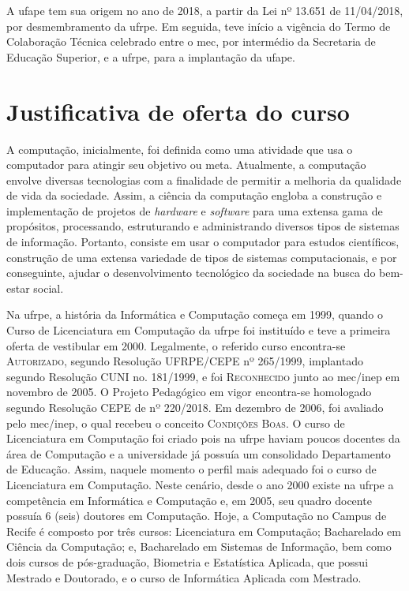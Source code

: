 \documentclass[
	12pt,				%
	openright,			%
  oneside,     %
	a4paper,			%
 hyphens,
	chapter=TITLE,		%
	english,			%
	french,				%
	spanish,			%
	brazil				%
	]{abntex2}
\begin{document}
A \acrshort{ufape} tem sua origem no ano de 2018, a partir da Lei nº 13.651 de 11/04/2018, por desmembramento da \acrshort{ufrpe}. Em seguida, teve início a vigência do Termo de Colaboração Técnica celebrado entre o \acrshort{mec}, por intermédio da Secretaria de Educação Superior, e a \acrshort{ufrpe}, para a implantação da \acrshort{ufape}.

\chapter{Justificativa de oferta do curso}

A computação, inicialmente, foi definida como uma atividade que usa o computador para atingir seu objetivo ou meta. Atualmente, a computação envolve diversas tecnologias com a finalidade de permitir a melhoria da qualidade de vida da sociedade. Assim, a ciência da computação engloba a construção e implementação de projetos de \textit{hardware} e \textit{software} para uma extensa gama de propósitos, processando, estruturando e administrando diversos tipos de sistemas de informação. Portanto, consiste em usar o computador para estudos científicos, construção de uma extensa variedade de tipos de sistemas computacionais, e por conseguinte, ajudar o desenvolvimento tecnológico da sociedade na busca do bem-estar social.

Na \acrshort{ufrpe}, a história da Informática e Computação começa em 1999, quando o Curso de Licenciatura em Computação da \acrshort{ufrpe} foi instituído e teve a primeira oferta de vestibular em 2000. Legalmente, o referido curso encontra-se \textsc{Autorizado}, segundo Resolução UFRPE/CEPE nº 265/1999, implantado segundo Resolução CUNI no. 181/1999, e foi \textsc{Reconhecido} junto ao \acrshort{mec}/\acrshort{inep} em novembro de 2005. O Projeto Pedagógico em vigor encontra-se homologado segundo Resolução CEPE de nº 220/2018. Em dezembro de 2006, foi avaliado pelo \acrshort{mec}/\acrshort{inep}, o qual recebeu o conceito \textsc{Condições Boas}. O curso de Licenciatura em Computação foi criado pois na \acrshort{ufrpe} haviam poucos docentes da área de Computação e a universidade já possuía um consolidado Departamento de Educação. Assim, naquele momento o perfil mais adequado foi o curso de Licenciatura em Computação. Neste cenário, desde o ano 2000 existe na \acrshort{ufrpe} a competência em Informática e Computação e, em 2005, seu quadro docente possuía 6 (seis) doutores em Computação. Hoje, a Computação no Campus de Recife é composto por três cursos:  Licenciatura em Computação; Bacharelado em Ciência da Computação; e, Bacharelado em Sistemas de Informação, bem como dois cursos de pós-graduação, Biometria e Estatística Aplicada, que possui Mestrado e Doutorado, e o curso de Informática Aplicada com Mestrado. 
\end{document}
